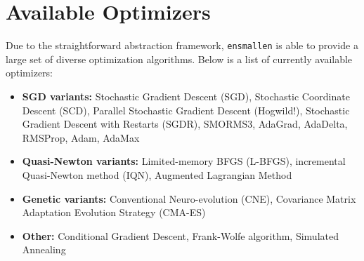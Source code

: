 \documentclass{article}
\begin{document}
\section{Available Optimizers}
\vspace*{-0.5em}

Due to the straightforward abstraction framework, {\tt ensmallen} is able to
provide a large set of diverse optimization algorithms.  Below is a list of
currently available optimizers:

\vspace*{-0.4em}
\begin{itemize}
  \item {\bf SGD variants:} Stochastic Gradient Descent (SGD), Stochastic
      Coordinate Descent (SCD), Parallel Stochastic Gradient Descent (Hogwild!),
      Stochastic Gradient Descent with Restarts (SGDR), SMORMS3, AdaGrad,
      AdaDelta, RMSProp, Adam, AdaMax

  \item {\bf Quasi-Newton variants:} Limited-memory BFGS (L-BFGS), incremental
        Quasi-Newton method (IQN), Augmented Lagrangian Method

  \item {\bf Genetic variants:} Conventional Neuro-evolution (CNE), Covariance
        Matrix Adaptation Evolution Strategy (CMA-ES)

  \item {\bf Other:} Conditional Gradient Descent, Frank-Wolfe algorithm, Simulated Annealing

\end{itemize}
\vspace*{-0.4em}

\end{document}
